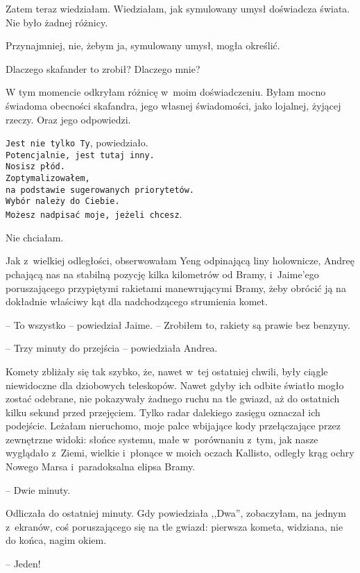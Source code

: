 \documentclass[oneside,polish,11pt,sfheadings]{mwbk}
\begin{document}
Zatem teraz wiedziałam. Wiedziałam, jak symulowany umysł doświadcza
świata. Nie było żadnej różnicy.

Przynajmniej, nie, żebym ja, symulowany umysł, mogła określić.

Dlaczego skafander to zrobił? Dlaczego mnie?

W tym momencie odkryłam różnicę w~moim doświadczeniu. Byłam mocno
świadoma obecności skafandra, jego własnej świadomości, jako lojalnej,
żyjącej rzeczy. Oraz jego odpowiedzi.

\texttt{Jest nie tylko Ty}, powiedziało. \\ 
\texttt{Potencjalnie, jest tutaj inny. \\ Nosisz płód. \\ Zoptymalizowałem, \\ na podstawie sugerowanych priorytetów. \\ Wybór należy do Ciebie.\\ Możesz nadpisać moje, jeżeli
chcesz}.

Nie chciałam.

Jak z~wielkiej odległości, obserwowałam Yeng odpinającą liny holownicze,
Andreę pchającą nas na stabilną pozycję kilka kilometrów od Bramy, i~Jaime'ego poruszającego przypiętymi rakietami manewrującymi Bramy, żeby
obrócić ją na dokładnie właściwy kąt dla nadchodzącego strumienia komet.

-- To wszystko -- powiedział Jaime. -- Zrobiłem to, rakiety są prawie bez
benzyny.

-- Trzy minuty do przejścia -- powiedziała Andrea.

Komety zbliżały się tak szybko, że, nawet w~tej ostatniej chwili, były
ciągle niewidoczne dla dziobowych teleskopów. Nawet gdyby ich odbite
światło mogło zostać odebrane, nie pokazywały żadnego ruchu na tle
gwiazd, aż do ostatnich kilku sekund przed przejęciem. Tylko radar
dalekiego zasięgu oznaczał ich podejście. Leżałam nieruchomo, moje palce
wbijające kody przełączające przez zewnętrzne widoki: słońce systemu,
małe w~porównaniu z~tym, jak nasze wyglądało z~Ziemi, wielkie i~płonące
w moich oczach Kallisto, odległy krąg ochry Nowego Marsa i~paradoksalna
elipsa Bramy.

-- Dwie minuty.

Odliczała do ostatniej minuty. Gdy powiedziała ,,Dwa'', zobaczyłam, na
jednym z~ekranów, coś poruszającego się na tle gwiazd: pierwsza kometa,
widziana, nie do końca, nagim okiem.

-- Jeden!
\end{document}
